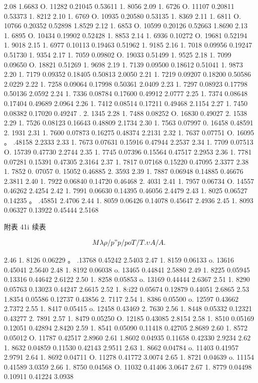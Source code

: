 2.08 1.6683 O. 11282 0.21045 0.53611 1. 8056 2.09 1. 6726 O. 11107 0.20811 0.53373 1. 8212 2.10 1. 6769 O. 10935 0.20580 0.53135 1. 8369 2.11 1. 6811 O. 10766 0.20352 0.52898 1.8529 2.12 1. 6853 O. 10599 0.20126 0.52663 1.8690 2.13 1. 6895 O. 10434 0.19902 0.52428 1. 8853 2.14 1. 6936 0.10272 O. 19681 0.52194 1. 9018 2.15 1. 6977 0.10113 0.19463 0.51962 1. 9185 2.16 1. 7018 0.09956 0.19247 0.51730 1. 9354 2.17 1. 7059 0.09802 O. 19033 0.51499 1. 9525 2.18 1. 7099 0.09650 O. 18821 0.51269 1. 9698 2.19 1. 7139 0.09500 0.18612 0.51041 1. 9873 2.20 1. 7179 0.09352 0.18405 0.50813 2.0050 2.21 1. 7219 0.09207 0.18200 0.50586 2.0229 2.22 1. 7258 0.09064 0.17998 0.50361 2.0409 2.23 1. 7297 0.08923 0.17798 0.50136 2.0592 2.24 1. 7336 0.08784 0.17600 0.49912 2.0777 2.25 1. 7374 0.08648 0.17404 0.49689 2.0964 2.26 1. 7412 0.08514 0.17211 0.49468 2.1154 2.27 1. 7450 0.08382 0.17020 0.49247 . 2. 1345 2.28 1. 7488 0.08252 O. 16830 0.49027 2. 1538 2.29 1. 7526 0.08123 0.16643 0.48809 2.1734 2.30 1. 7563 0.07997 0. 16458 0.48591 2. 1931 2.31 1. 7600 0.07873 0.16275 0.48374 2.2131 2.32 1. 7637 0.07751 O. 16095 。 .48158 2.2333 2.33 1. 7673 0.07631 0.15916 0.47944 2.2537 2.34 1. 7709 0.07513 O. 15739 0.47730 2.2744 2.35 1. 7745 0.07396 0.15564 0.47517 2.2953 2.36 1. 7781 0.07281 0.15391 0.47305 2.3164 2.37 1. 7817 0.07168 0.15220 0.47095 2.3377 2.38 1. 7852 0. 07057 0. 15052 0.46885 2. 3593 2.39 1. 7887 0.06948 0.14885 0.46676 2.3811 2.40 1. 7922 0.06840 0.14720 0.46468 2. 4031 2.41 1. 7957 0.06734 O. 14557 0.46262 2.4254 2.42 1. 7991 0.06630 0.14395 0.46056 2.4479 2.43 1. 8025 0.06527 0.14235 。 .45851 2.4706 2.44 1. 8059 0.06426 0.14078 0.45647 2.4936 2.45 1. 8093 0.06327 0.13922 0.45444 2.5168

附表 41${\rm i}$ 续表

\[M \lambda  \rho  / p" p/ po T/T.\upsilon  A / A.\]

2.46 1. 8126 0.06229 。 .13768 0.45242 2.5403 2.47 1. 8159 0.06133 o. 13616 0.45041 2.5640 2.48 1. 8192 0.06038 o. 13465 0.44841 2.5880 2.49 1. 8225 0.05945 0.13316 0.44642 2.6122 2.50 1. 8258 0.05853 o. 13169 0.44444 2.6367 2.51 1. 8290 0.05763 0.13023 0.44247 2.6615 2.52 1. 8:i22 0.05674 0.12879 0.44051 2.6865 2.53 1.8354 0.05586 0.12737 0.43856 2. 7117 2.54 1. 8386 0.05500 o. 12597 0.43662 2.7372 2.55 1. 8417 0.05415 o. 12458 0.43469 2. 7630 2.56 1. 8448 0.05332 0.12321 0.43277 2. 7891 2.57 1. 8479 0.05250 O. 12185 0.43085 2.8154 2.58 1. 8510 0.05169 0.12051 0.42894 2.8420 2.59 1. 8541 0.05090 0.11418 0.42705 2.8689 2.60 1. 8572 0.05012 O. 11787 0.42517 2.8960 2.61 1.8602 0.04935 0.11658 0.42330 2.9234 2.62 1. 8632 0.04859 0.11530 0.42143 2.9511 2.63 1. 8662 0.04784 o. 11403 0.41957 2.9791 2.64 1. 8692 0.04711 O. 11278 0.41772 3.0074 2.65 1. 8721 0.04639 o. 11154 0.41589 3.0359 2.66 1. 8750 0.04568 O. 11032 0.41406 3.0647 2.67 1. 8779 0.04498 0.10911 0.41224 3.0938

